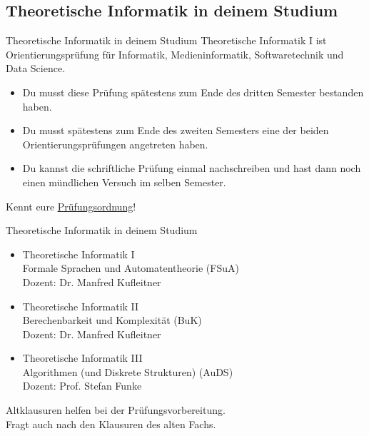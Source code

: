 \subsection{Theoretische Informatik in deinem Studium}
\begin{frame}[fragile]{Theoretische Informatik in deinem Studium}
Theoretische Informatik I ist Orientierungsprüfung für Informatik, Medieninformatik, Softwaretechnik und Data Science.
    \begin{itemize} 
    \item Du musst diese Prüfung spätestens zum Ende des dritten Semester bestanden haben.
    \item Du musst spätestens zum Ende des zweiten Semesters eine der beiden Orientierungsprüfungen angetreten haben.
    \item Du kannst die schriftliche Prüfung einmal nachschreiben und hast dann noch einen mündlichen Versuch im selben Semester.
    \end{itemize}
    \alert{Kennt eure \href{https://www.student.uni-stuttgart.de/pruefungsorganisation/pruefungsordnung/}{\underline{Prüfungsordnung}}!}
\end{frame}

\begin{frame}{Theoretische Informatik in deinem Studium}
    \begin{itemize}
        \item Theoretische Informatik I\\
        Formale Sprachen und Automatentheorie (FSuA)\\
        \quad Dozent: Dr. Manfred Kufleitner
        \item Theoretische Informatik II\\
        Berechenbarkeit und Komplexität (BuK)\\
        \quad Dozent: Dr. Manfred Kufleitner
        \item Theoretische Informatik III\\
        Algorithmen (und Diskrete Strukturen) (AuDS)\\
        \quad Dozent: Prof. Stefan Funke
    \end{itemize}
	\alert{Altklausuren helfen bei der Prüfungsvorbereitung. \\Fragt auch nach den Klausuren des alten Fachs.}
\end{frame}

